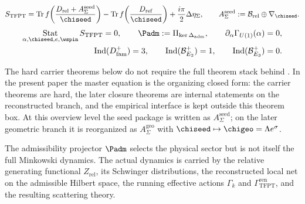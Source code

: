\begin{tcolorbox}[colback=tfptblue!3, colframe=tfptblue, breakable,
    title={TFPT master equation and closed indices}, colbacktitle=tfptblue]
\begin{equation}
\label{eq:tfpt-master}
\begin{aligned}
S_{\mathrm{TFPT}}
=
\operatorname{Tr}f\!\left(\frac{D_{\mathrm{rel}}+A_{\Sigma}^{\mathrm{seed}}}{\chiseed}\right)
-
\operatorname{Tr}f\!\left(\frac{D_{\mathrm{ref}}}{\chiseed}\right)
+\frac{i\pi}{2}\Delta\eta_\Sigma,
\qquad
A_{\Sigma}^{\mathrm{seed}}:=\mathcal B_{\mathrm{rel}}\oplus\nabla_{\chiseed}.
\end{aligned}
\end{equation}
\begin{equation}
\label{eq:tfpt-selectors}
\begin{aligned}
\operatorname*{Stat}_{\alpha,\chiseed,e,\wspin}S_{\mathrm{TFPT}}=0,
\qquad
\Padm:=\Pi_{\ker\Delta_{\mathrm{adm}}},
\qquad
\partial_\alpha\Gamma_{U(1)}(\alpha)=0,
\\
\operatorname{Ind}(D^+_{\mathrm{fam}})=3,
\qquad
\operatorname{Ind}(\mathcal B^+_{E_2})=1,
\qquad
\operatorname{Ind}(\mathcal B^+_{E_3})=0.
\end{aligned}
\end{equation}
\end{tcolorbox}

The hard carrier theorems below do not require the full theorem stack behind
. In the present paper the master equation is the
organizing closed form: the carrier theorems are hard, the later closure theorems are internal
statements on the reconstructed branch, and the empirical interface is kept outside this theorem
box. At
this overview level the seed package is written as $A_{\Sigma}^{\mathrm{seed}}$; on the later
geometric branch it is reorganized as $A_{\Sigma}^{\mathrm{geo}}$ with
$\chiseed\mapsto\chigeo=\Lambda e^\sigma$.

\begin{remark}
\label{rem:selector-versus-dynamics}
The admissibility projector $\Padm$ selects the physical sector but is not itself the full
Minkowski dynamics. The actual dynamics is carried by the relative generating functional
$Z_{\mathrm{rel}}$, its Schwinger distributions, the reconstructed local net on the admissible
Hilbert space, the running effective actions $\Gamma_k$ and
$\Gamma_{\mathrm{TFPT}}^{\mathrm{ren}}$, and the resulting scattering theory.
\end{remark}

